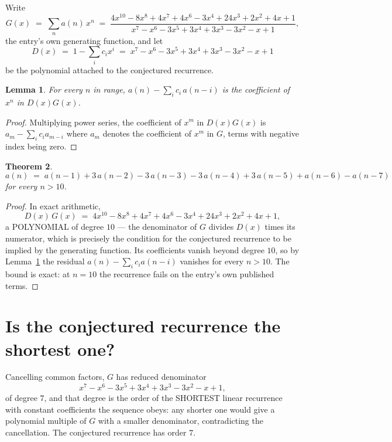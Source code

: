 \documentclass[11pt,a4paper]{article}
\theoremstyle{plain}
\newtheorem{theorem}{Theorem}
\newtheorem{lemma}[theorem]{Lemma}
\theoremstyle{definition}
\begin{document}
Write
\[
G(x)\;=\;\sum_{n}a(n)\,x^{n}\;=\;\frac{4 x^{10} - 8 x^{8} + 4 x^{7} + 4 x^{6} - 3 x^{4} + 24 x^{3} + 2 x^{2} + 4 x + 1}{x^{7} - x^{6} - 3 x^{5} + 3 x^{4} + 3 x^{3} - 3 x^{2} - x + 1},
\]
the entry's own generating function, and let
\[
D(x)\;=\;1-\sum_i c_i x^{i}\;=\;x^{7} - x^{6} - 3 x^{5} + 3 x^{4} + 3 x^{3} - 3 x^{2} - x + 1
\]
be the polynomial attached to the conjectured recurrence.

\begin{lemma}\label{lem:key}
For every $n$ in range, $a(n)-\sum_i c_i\,a(n-i)$ is the coefficient of $x^{n}$ in
$D(x)G(x)$.
\end{lemma}

\begin{proof}
Multiplying power series, the coefficient of $x^{m}$ in $D(x)G(x)$ is
$a_m-\sum_i c_i a_{m-i}$ where $a_m$ denotes the coefficient of $x^{m}$ in $G$, terms with
negative index being zero.
\end{proof}

\begin{theorem}
\[
a(n)\;=\;a(n-1) + 3\,a(n-2) - 3\,a(n-3) - 3\,a(n-4) + 3\,a(n-5) + a(n-6) - a(n-7)
\]
for every $n>10$.
\end{theorem}

\begin{proof}
In exact arithmetic,
\[
D(x)\,G(x)\;=\;4 x^{10} - 8 x^{8} + 4 x^{7} + 4 x^{6} - 3 x^{4} + 24 x^{3} + 2 x^{2} + 4 x + 1,
\]
a POLYNOMIAL of degree $10$ --- the denominator of $G$ divides $D(x)$ times its numerator,
which is precisely the condition for the conjectured recurrence to be implied by the
generating function. Its coefficients vanish beyond degree $10$, so by
Lemma~\ref{lem:key} the residual $a(n)-\sum_ic_ia(n-i)$ vanishes for every
$n>10$. The bound is exact: at $n=10$ the recurrence fails on the entry's own published terms.
\end{proof}

\section{Is the conjectured recurrence the shortest one?}

Cancelling common factors, $G$ has reduced denominator
\[
x^{7} - x^{6} - 3 x^{5} + 3 x^{4} + 3 x^{3} - 3 x^{2} - x + 1,
\]
of degree $7$, and that degree is the order of the SHORTEST linear recurrence with
constant coefficients the sequence obeys: any shorter one would give a polynomial multiple of
$G$ with a smaller denominator, contradicting the cancellation. The conjectured recurrence has
order $7$.
\end{document}
